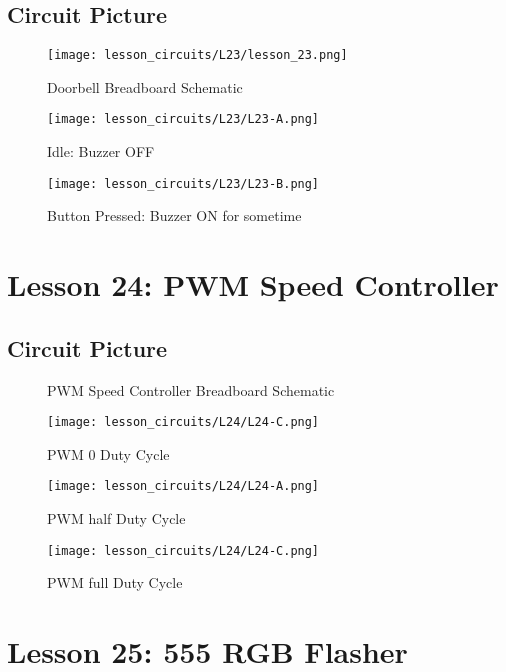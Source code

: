 \subsection{Circuit Picture}
\begin{figure}[htp]
    \centering
    \texttt{[image: lesson\_circuits/L23/lesson\_23.png]}
    \caption{Doorbell Breadboard Schematic}
    \label{fig:555_doorbell_sch}
\end{figure}
\begin{figure}[htp]
    \centering
    \texttt{[image: lesson\_circuits/L23/L23-A.png]}
    \caption{Idle: Buzzer OFF}
    \label{fig:555_doorbell_obb}
\end{figure}
\begin{figure}[htp]
    \centering
    \texttt{[image: lesson\_circuits/L23/L23-B.png]}
    \caption{Button Pressed: Buzzer ON for sometime}
    \label{fig:555_doorbell_obb1}
\end{figure}
\section{Lesson 24: PWM Speed Controller}
\subsection{Circuit Picture}
\begin{figure}[htp]
    \centering
    \caption{PWM Speed Controller Breadboard Schematic}
    \label{fig:555_pwm_sch}
\end{figure}
\begin{figure}[htp]
    \centering
    \texttt{[image: lesson\_circuits/L24/L24-C.png]}
    \caption{PWM 0 Duty Cycle}
    \label{fig:555_pwm_obb}
\end{figure}
\begin{figure}[htp]
    \centering
    \texttt{[image: lesson\_circuits/L24/L24-A.png]}
    \caption{PWM half Duty Cycle}
    \label{fig:555_pwm_obb1}
\end{figure}
\begin{figure}[htp]
    \centering
    \texttt{[image: lesson\_circuits/L24/L24-C.png]}
    \caption{PWM full Duty Cycle}
    \label{fig:555_pwm_obb2}
\end{figure}
\section{Lesson 25: 555 RGB Flasher}
